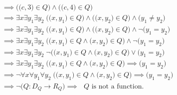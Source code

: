 \documentclass[12pt, letterpaper]{article}
\begin{document}
        \begin{align*}
            & \implies \Big(\big(c, 3\big) \in Q\Big) \wedge \Big(\big(c, 4\big) \in Q\Big) \\ 
            & \implies \exists x \exists y_1 \exists y_2 \; \Big( \big(x, y_1\big) \in Q \Big) \wedge
                                                   \Big( \big(x, y_2\big) \in Q \Big) \wedge
                                                   \Big( y_1 \neq y_2 \Big) \\
            & \implies \exists x \exists y_1 \exists y_2 \; \Big( \big(x, y_1\big) \in Q \Big) \wedge
                                                   \Big( \big(x, y_2\big) \in Q \Big) \wedge
                                                   \neg\Big( y_1 = y_2 \Big) \\
            & \implies \exists x \exists y_1 \exists y_2 \; \Big( \big(x, y_1\big) \in Q \wedge
                                                   \big(x, y_2\big) \in Q \Big) \wedge
                                                   \neg\Big( y_1 = y_2 \Big) \\
            & \implies \exists x \exists y_1 \exists y_2 \; \neg\Big( \big(x, y_1\big) \in Q \wedge
                                                   \big(x, y_2\big) \in Q \Big) \lor
                                                   \Big( y_1 = y_2 \Big) \\
            & \implies \exists x \exists y_1 \exists y_2 \; \Big( \big(x, y_1\big) \in Q \wedge
                                                   \big(x, y_2\big) \in Q \Big) \implies
                                                   \Big( y_1 = y_2 \Big) \\
            & \implies \neg\forall x \forall y_1 \forall y_2 \; \Big( \big(x, y_1\big) \in Q \wedge
                                                   \big(x, y_2\big) \in Q \Big) \implies
                                                   \Big( y_1 = y_2 \Big) \\
            & \implies \neg\Big( Q : D_{Q} \to R_{Q} \Big)
              \implies \text{ \(Q\) is not a function.}
        \end{align*}
\end{document}
